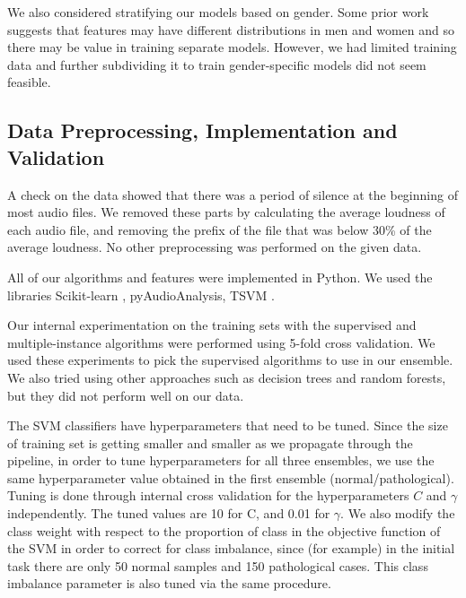 We also considered stratifying our models based on gender. Some prior work suggests that features may have different distributions in men and women and so there may be value in training separate models. However, we had limited training data and further subdividing it to train gender-specific models did not seem feasible.

\subsection{Data Preprocessing, Implementation and Validation}
A check on the data showed that there was a period of silence at the beginning of most audio files. We removed these parts by calculating the average loudness of each audio file, and removing the prefix of the file that was below  30\% of the average loudness. No other preprocessing was performed on the given data.

All of our algorithms and features were implemented in Python. We used the libraries Scikit-learn \cite{b17}, pyAudioAnalysis\cite{b6}, TSVM\cite{} . 

Our internal experimentation on the training sets with the supervised and multiple-instance algorithms were performed using 5-fold cross validation. We used these experiments to pick the supervised algorithms to use in our ensemble. We also tried using other approaches such as decision trees and random forests, but they did not perform well on our data.

The SVM classifiers have hyperparameters that need to be tuned. Since the size of training set is getting smaller and smaller as we propagate through the pipeline, in order to tune hyperparameters for all three ensembles, we use the same hyperparameter value obtained in the first ensemble (normal/pathological). Tuning is done through internal cross validation for the hyperparameters $C$ and $\gamma$ independently. The tuned values are 10 for C, and 0.01 for $\gamma$. We also modify the class weight with respect to the proportion of class in the objective function of the SVM in order to correct for class imbalance, since (for example) in the initial task there are only 50 normal samples and 150 pathological cases. This class imbalance parameter is also tuned via the same procedure. 

